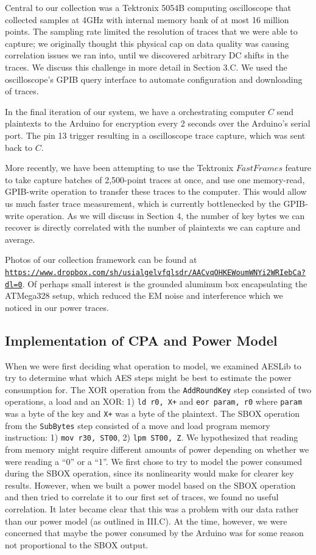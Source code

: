 \documentclass[journal]{ieee_style}
\begin{document}
Central to our collection was a Tektronix 5054B computing oscilloscope that collected samples at 4GHz with internal memory bank of at most 16 million points. The sampling rate limited the resolution of traces that we were able to capture; we originally thought this physical cap on data quality was causing correlation issues we ran into, until we discovered arbitrary DC shifts in the traces. We discuss this challenge in more detail in Section 3.C. We used the oscilloscope's GPIB query interface to automate configuration and downloading of traces.

In the final iteration of our system, we have a orchestrating computer $C$ send plaintexts to the Arduino for encryption every 2 seconds over the Arduino's serial port. The pin 13 trigger resulting in a oscilloscope trace capture, which was sent back to $C$. 

More recently, we have been attempting to use the Tektronix $Fast Frames$ feature to take capture batches of 2,500-point traces at once, and use one memory-read, GPIB-write operation to transfer these traces to the computer. This would allow us much faster trace measurement, which is currently bottlenecked by the GPIB-write operation. As we will discuss in Section 4, the number of key bytes we can recover is directly correlated with the number of plaintexts we can capture and average.

Photos of our collection framework can be found at \texttt{\url{https://www.dropbox.com/sh/usialgelvfqlsdr/AACvqOHKEWoumWNYi2WRIebCa?dl=0}}. Of perhaps small interest is the grounded aluminum box encapsulating the ATMega328 setup, which reduced the EM noise and interference which we noticed in our power traces.

\subsection{Implementation of CPA and Power Model}

When we were first deciding what operation to model, we examined AESLib to try to determine what which AES steps might be best to estimate the power consumption for. The XOR operation from the \texttt{AddRoundKey} step consisted of two operations, a load and an XOR: 1) \texttt{ld r0, X+} and \texttt{eor param, r0} where \texttt{param} was a byte of the key and \texttt{X+} was a byte of the plaintext. The SBOX operation from the \texttt{SubBytes} step consisted of a move and load program memory instruction: 1) \texttt{mov r30, ST00}, 2) \texttt{lpm ST00, Z}. We hypothesized that reading from memory might require different amounts of power depending on whether we were reading a ``0'' or a ``1''. We first chose to try to model the power consumed during the SBOX operation, since its nonlinearity would make for clearer key results. However, when we built a power model based on the SBOX operation and then tried to correlate it to our first set of traces, we found no useful correlation. It later became clear that this was a problem with our data rather than our power model (as outlined in III.C). At the time, however, we were concerned that maybe the power consumed by the Arduino was for some reason not proportional to the SBOX output. 
\end{document}
